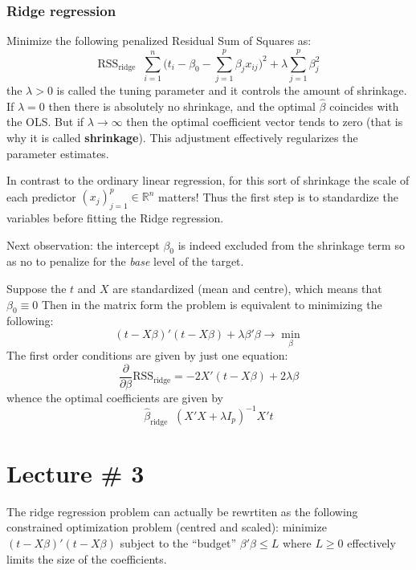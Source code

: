 \documentclass[a4paper]{article}
\newcommand{\brac}[1]{{\left ( #1 \right )}}
\newcommand{\Real}{\mathbb{R}}
\newcommand{\RSS}{\text{RSS}}
\newcommand{\defn}{\mathop{\overset{\Delta}{=}}\nolimits}
\begin{document}
\subsubsection{Ridge regression} %
\label{ssub:ridge_regression}

Minimize the following penalized Residual Sum of Squares as:
\[\RSS_\text{ridge} \defn \sum_{i=1}^n \bigl(t_i - \beta_0 - \sum_{j=1}^p \beta_j x_{ij}\bigr)^2 + \lambda \sum_{j=1}^p \beta_j^2\]
the $\lambda>0$ is called the tuning parameter and it controls the amount of shrinkage.
If $\lambda = 0$ then there is absolutely no shrinkage, and the optimal $\hat{\beta}$
coincides with the OLS. But if $\lambda\to \infty$ then the optimal coefficient
vector tends to zero (that is why it is called \textbf{shrinkage}). This adjustment
effectively regularizes the parameter estimates.

In contrast to the ordinary linear regression, for this sort of shrinkage the scale
of each predictor $\brac{x_j}_{j=1}^p\in \Real^n$ matters! Thus the first step is
to standardize the variables before fitting the Ridge regression.

Next observation: the intercept $\beta_0$ is indeed excluded from the shrinkage
term so as no to penalize for the \emph{base} level of the target.

Suppose the $t$ and $X$ are standardized (mean and centre), which means that $\beta_0 \equiv 0$
Then in the matrix form the problem is equivalent to minimizing the following:
\[(t-X\beta)'(t-X\beta) + \lambda \beta'\beta \to \min_\beta\]
The first order conditions are given by just one equation:
\[\frac{\partial}{\partial \beta} \RSS_\text{ridge} = - 2 X'(t-X\beta) + 2 \lambda \beta\]
whence the optimal coefficients are given by
\[\hat{\beta}_\text{ridge} \defn (X'X + \lambda I_p)^{-1}X't\]




\clearpage
\section{Lecture \# 3} %
\label{sec:lecture_3}
The ridge regression problem can actually be rewrtiten as the following constrained
optimization problem (centred and scaled): minimize $(t-X\beta)'(t-X\beta)$ subject
to the ``budget'' $\beta'\beta\leq L$ where $L\geq0$ effectively limits the size
of the coefficients.
\end{document}

